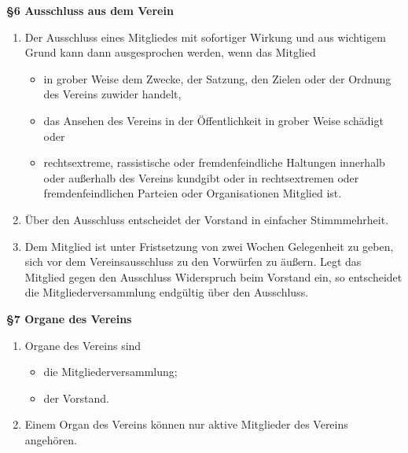 \documentclass[a4paper,
               12pt,
               titlepage,
               parskip=half]{scrartcl}
\begin{document}
\textbf{§6 Ausschluss aus dem Verein}
{\small
	\begin{enumerate}
		\item Der Ausschluss eines Mitgliedes mit sofortiger Wirkung und aus wichtigem Grund kann dann ausgesprochen werden, wenn das Mitglied
		\begin{itemize}
		    \item in grober Weise dem Zwecke, der Satzung, den Zielen oder der Ordnung des Vereins zuwider handelt,
			\item das Ansehen des Vereins in der Öffentlichkeit in grober Weise schädigt oder
			\item rechtsextreme, rassistische oder fremdenfeindliche Haltungen innerhalb oder außerhalb des Vereins kundgibt oder in rechtsextremen oder fremdenfeindlichen Parteien oder Organisationen Mitglied ist.
		\end{itemize}
		\item Über den Ausschluss entscheidet der Vorstand in einfacher Stimmmehrheit.
		\item Dem Mitglied ist unter Fristsetzung von zwei Wochen Gelegenheit zu geben, sich vor dem Vereinsausschluss zu den Vorwürfen zu äußern. Legt das Mitglied gegen den Ausschluss Widerspruch beim Vorstand ein, so entscheidet die Mitgliederversammlung endgültig über den Ausschluss.
	\end{enumerate}
}

\vspace{1.0em}

\textbf{§7 Organe des Vereins}
{\small
	\begin{enumerate}
		\item Organe des Vereins sind
		\begin{itemize}
			\item die Mitgliederversammlung;
			\item der Vorstand.
		\end{itemize}
	    \item Einem Organ des Vereins können nur aktive Mitglieder des Vereins angehören.
	\end{enumerate}
}

\vspace{1.0em}
\end{document}
